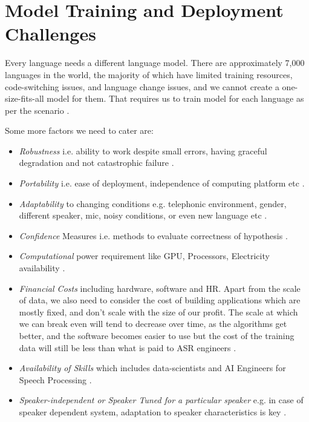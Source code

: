 \section{Model Training and Deployment Challenges}
\label{sub:model-training_asr_difficult}

Every language needs a different language model. There are approximately 7,000 languages in the world, the majority of which have limited training resources, code-switching issues, and language change issues, and we cannot create a one-size-fits-all model for them. That requires us to train model for each language as per the scenario \cite{pironkov_hybrid-task_2020}.

Some more factors we need to cater are:
\begin{itemize}
    \item \textit{Robustness} i.e. ability to work despite small errors, having graceful degradation and not catastrophic failure \cite{shrawankar_adverse_2013}.
    \item \textit{Portability} i.e. ease of deployment, independence of computing platform etc \cite{kincaid_state_2018}.
    \item \textit{Adaptability} to changing conditions e.g.  telephonic environment, gender, different speaker, mic, noisy conditions, or even new language etc \cite{kincaid_state_2018}.
    \item \textit{Confidence} Measures i.e. methods to evaluate correctness of hypothesis \cite{backstrom_introduction_2022}.
    \item \textit{Computational} power requirement like GPU, Processors, Electricity availability \cite{kincaid_state_2018}.
    \item \textit{Financial Costs} including hardware, software and HR. Apart from the scale of data, we also need to consider the cost of building applications which are mostly fixed, and don’t scale with the size of our profit. The scale at which we can break even will tend to decrease over time, as the algorithms get better, and the software becomes easier to use but the cost of the training data will still be less than what is paid to ASR engineers \cite{kincaid_state_2018}.
    \item \textit{Availability of Skills} which includes data-scientists and AI Engineers for Speech Processing \cite{kincaid_state_2018}.
    \item \textit{Speaker-independent or Speaker Tuned for a particular speaker} e.g. in case of speaker dependent system, adaptation to speaker characteristics is key \cite{shrawankar_adverse_2013}.

\end{itemize}
